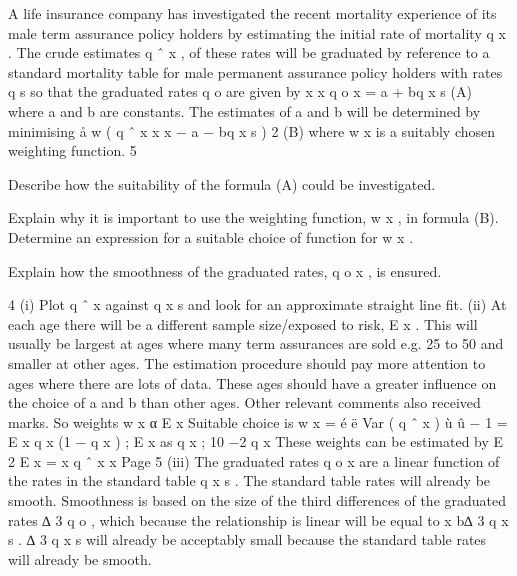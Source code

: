 \documentclass[a4paper,1pt]{article}
\begin{document}
A life insurance company has investigated the recent mortality experience of its
male term assurance policy holders by estimating the initial rate of mortality q x .
The crude estimates q ˆ x , of these rates will be graduated by reference to a
standard mortality table for male permanent assurance policy holders with rates
q s so that the graduated rates q o are given by
x
x
q o x = a + bq x s
(A)
where a and b are constants. The estimates of a and b will be determined by
minimising
å w ( q ˆ
x
x
x
− a − bq x s
)
2
(B)
where w x is a suitably chosen weighting function.
5
\item  Describe how the suitability of the formula (A) could be investigated.
\item  Explain why it is important to use the weighting function, w x , in
formula (B). Determine an expression for a suitable choice of function for
w x .

\item  
Explain how the smoothness of the graduated rates, q o x , is ensured.

4
(i) Plot q ˆ x against q x s and look for an approximate straight line fit.
(ii) At each age there will be a different sample size/exposed to risk, E x . This
will usually be largest at ages where many term assurances are sold e.g.
25 to 50 and smaller at other ages.
The estimation procedure should pay more attention to ages where there
are lots of data. These ages should have a greater influence on the choice
of a and b than other ages.
Other relevant comments also received marks.
So weights w x α E x
Suitable choice is w x = é ë Var ( q ˆ x ) ù û
− 1
= E x
q x (1 − q x )
; E x
as q x ; 10 −2
q x
These weights can be estimated by
E 2
E x
= x
q ˆ x
\theta x
Page 5 %
(iii)
The graduated rates q o x are a linear function of the rates in the standard
table q x s . The standard table rates will already be smooth.
Smoothness is based on the size of the third differences of the graduated
rates ∆ 3 q o , which because the relationship is linear will be equal to
x
b∆ 3 q x s . ∆ 3 q x s will already be acceptably small because the standard table
rates will already be smooth.
\end{document}
